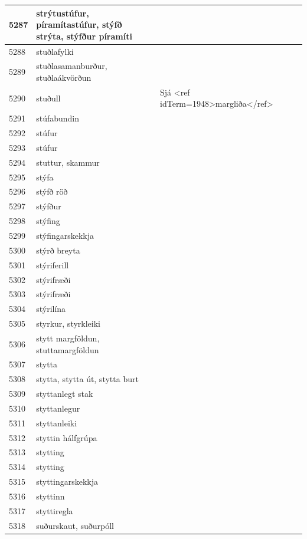 \begin{longtable}{p{}|p{}|p{}|p{}|p{}}
\hline
5287 & strýtustúfur, píramítastúfur, stýfð strýta, stýfður píramíti &  &  &  \\
\hline
5288 & stuðlafylki &  &  &  \\
\hline
5289 & stuðlasamanburður, stuðlaákvörðun &  &  &  \\
\hline
5290 & stuðull & Sjá <ref idTerm=1948>margliða</ref> &  &  \\
\hline
5291 & stúfabundin &  &  &  \\
\hline
5292 & stúfur &  &  &  \\
\hline
5293 & stúfur &  &  &  \\
\hline
5294 & stuttur, skammur &  &  &  \\
\hline
5295 & stýfa &  &  &  \\
\hline
5296 & stýfð röð &  &  &  \\
\hline
5297 & stýfður &  &  &  \\
\hline
5298 & stýfing &  &  &  \\
\hline
5299 & stýfingarskekkja &  &  &  \\
\hline
5300 & stýrð breyta &  &  &  \\
\hline
5301 & stýriferill &  &  &  \\
\hline
5302 & stýrifræði &  &  &  \\
\hline
5303 & stýrifræði &  &  &  \\
\hline
5304 & stýrilína &  &  &  \\
\hline
5305 & styrkur, styrkleiki &  &  &  \\
\hline
5306 & stytt margföldun, stuttamargföldun &  &  &  \\
\hline
5307 & stytta &  &  &  \\
\hline
5308 & stytta, stytta út, stytta burt &  &  &  \\
\hline
5309 & styttanlegt stak &  &  &  \\
\hline
5310 & styttanlegur &  &  &  \\
\hline
5311 & styttanleiki &  &  &  \\
\hline
5312 & styttin hálfgrúpa &  &  &  \\
\hline
5313 & stytting &  &  &  \\
\hline
5314 & stytting &  &  &  \\
\hline
5315 & styttingarskekkja &  &  &  \\
\hline
5316 & styttinn &  &  &  \\
\hline
5317 & styttiregla &  &  &  \\
\hline
5318 & suðurskaut, suðurpóll &  &  &  \\

\end{longtable}
